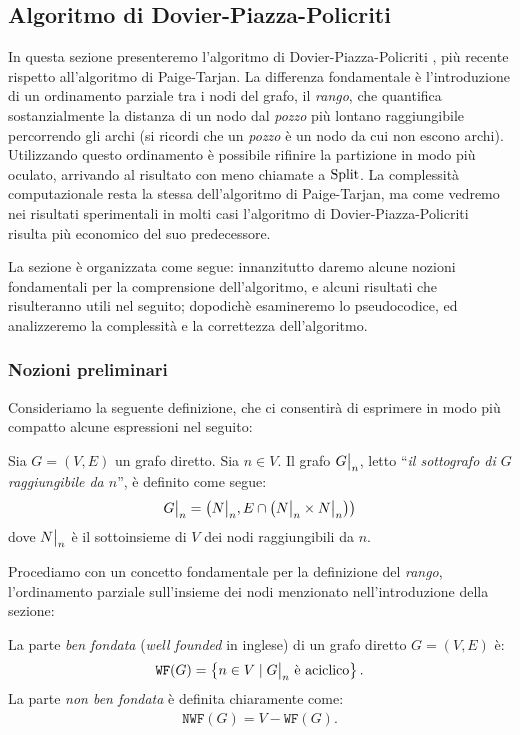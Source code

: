 \subsection{Algoritmo di Dovier-Piazza-Policriti}
\label{sec:dovier_piazza_policriti}
In questa sezione presenteremo l'algoritmo di Dovier-Piazza-Policriti \cite{dovier}, più recente rispetto all'algoritmo di Paige-Tarjan. La differenza fondamentale è l'introduzione di un ordinamento parziale tra i nodi del grafo, il \emph{rango}, che quantifica sostanzialmente la distanza di un nodo dal \emph{pozzo} più lontano raggiungibile percorrendo gli archi (si ricordi che un \emph{pozzo} è un nodo da cui non escono archi). Utilizzando questo ordinamento è possibile rifinire la partizione in modo più oculato, arrivando al risultato con meno chiamate a $\textup{Split}$. La complessità computazionale resta la stessa dell'algoritmo di Paige-Tarjan, ma come vedremo nei risultati sperimentali in molti casi l'algoritmo di Dovier-Piazza-Policriti risulta più economico del suo predecessore.

La sezione è organizzata come segue: innanzitutto daremo alcune nozioni fondamentali per la comprensione dell'algoritmo, e alcuni risultati che risulteranno utili nel seguito; dopodichè esamineremo lo pseudocodice, ed analizzeremo la complessità e la correttezza dell'algoritmo.

\subsubsection{Nozioni preliminari}
Consideriamo la seguente definizione, che ci consentirà di esprimere in modo più compatto alcune espressioni nel seguito:
\begin{definition}
    \label{def:grafo_restr}
    Sia $G = (V,E)$ un grafo diretto. Sia $n \in V$. Il grafo $\restr{G}{n}$, letto ``\emph{il sottografo di $G$ raggiungibile da $n$}'', è definito come segue:
    \begin{gather*}
        \restr{G}{n} = \left(\restr{N}{n}, E \cap \left(\restr{N}{n} \times \restr{N}{n}\right)\right)
    \end{gather*}
    dove $\restr{N}{n}$ è il sottoinsieme di $V$ dei nodi raggiungibili da $n$.
\end{definition}

Procediamo con un concetto fondamentale per la definizione del \emph{rango}, l'ordinamento parziale sull'insieme dei nodi menzionato nell'introduzione della sezione:
\begin{definition}
    La parte \emph{ben fondata} (\emph{well founded} in inglese) di un grafo diretto $G = (V,E)$ è:
    \begin{gather*}
        \texttt{WF}(G) = \left\{n \in V \mid \restr{G}{n} \text{ è aciclico}\right\}.
    \end{gather*}
    La parte \emph{non ben fondata} è definita chiaramente come:
    \begin{gather*}
        \texttt{NWF}(G) = V - \texttt{WF}(G).
    \end{gather*}
\end{definition}

